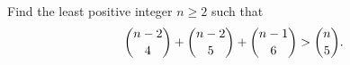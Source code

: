 Find the least positive integer $n\ge2$ such that
\[\dbinom{n-2}{4}+\dbinom{n-2}{5}+\dbinom{n-1}{6}>\dbinom{n}{5}.\]
